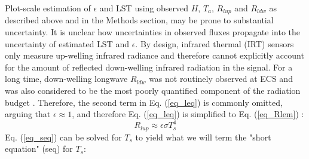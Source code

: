 \documentclass[fleqn,10pt]{wlscirep}
\begin{document}
Plot-scale estimation of $\epsilon$ and LST using observed $H$, $T_{a}$, $R_{lup}$ and $R_{ldw}$ as described above and in the Methods section, may be prone to substantial uncertainty. It is unclear how uncertainties in observed fluxes propagate into the uncertainty of estimated LST and $\epsilon$. By design, infrared thermal (IRT) sensors only measure up-welling infrared radiance and therefore cannot explicitly account for the amount of reflected down-welling infrared radiation in the signal. For a long time, down-welling longwave $R_{ldw}$ was not routinely observed at ECS \cite{wang_evaluation_2009-1} and was also considered to be the most poorly quantified component of the radiation budget \cite{trenberth2012tracking}. Therefore, the second term in Eq. (\ref{eq_leq}) is commonly omitted, arguing that $\epsilon\approx 1$, and therefore Eq. (\ref{eq_leq}) is simplified to Eq. (\ref{eq_Rlem}) \cite{crago_use_2014-3}:
\begin{equation}\label{eq_seq}
R_{lup} \approx \epsilon \sigma T_{s}^{4}
\end{equation} 
Eq. (\ref{eq_seq}) can be solved for $T_s$ to yield what we will term the "short equation" (seq) for $T_s$:
\end{document}
